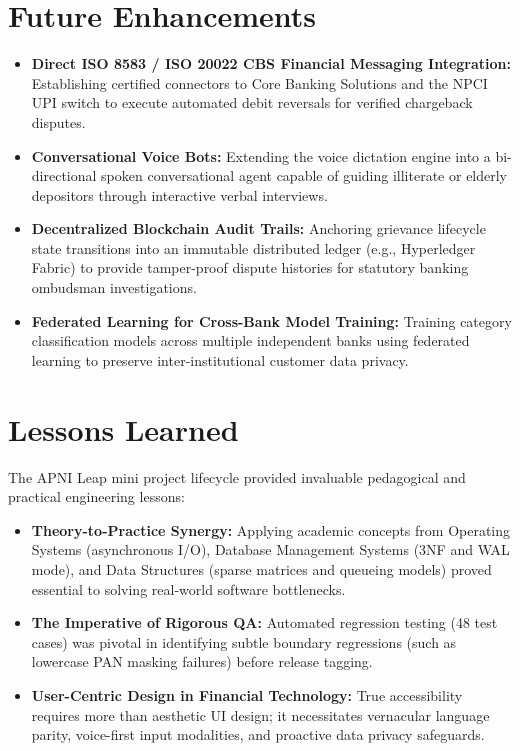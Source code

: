 \section{Future Enhancements}
\begin{itemize}
    \item \textbf{Direct ISO 8583 / ISO 20022 CBS Financial Messaging Integration:} Establishing certified connectors to Core Banking Solutions and the NPCI UPI switch to execute automated debit reversals for verified chargeback disputes.
    \item \textbf{Conversational Voice Bots:} Extending the voice dictation engine into a bi-directional spoken conversational agent capable of guiding illiterate or elderly depositors through interactive verbal interviews.
    \item \textbf{Decentralized Blockchain Audit Trails:} Anchoring grievance lifecycle state transitions into an immutable distributed ledger (e.g., Hyperledger Fabric) to provide tamper-proof dispute histories for statutory banking ombudsman investigations.
    \item \textbf{Federated Learning for Cross-Bank Model Training:} Training category classification models across multiple independent banks using federated learning to preserve inter-institutional customer data privacy.
\end{itemize}

\section{Lessons Learned}
The APNI Leap mini project lifecycle provided invaluable pedagogical and practical engineering lessons:
\begin{itemize}
    \item \textbf{Theory-to-Practice Synergy:} Applying academic concepts from Operating Systems (asynchronous I/O), Database Management Systems (3NF and WAL mode), and Data Structures (sparse matrices and queueing models) proved essential to solving real-world software bottlenecks.
    \item \textbf{The Imperative of Rigorous QA:} Automated regression testing (48 test cases) was pivotal in identifying subtle boundary regressions (such as lowercase PAN masking failures) before release tagging.
    \item \textbf{User-Centric Design in Financial Technology:} True accessibility requires more than aesthetic UI design; it necessitates vernacular language parity, voice-first input modalities, and proactive data privacy safeguards.
\end{itemize}
